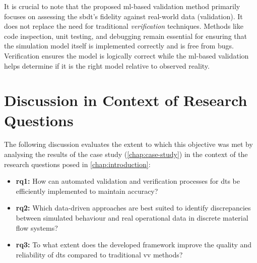 It is crucial to note that the proposed \gls{ml}-based validation method primarily focuses on assessing the \gls{sbdt}'s fidelity against real-world data (validation). It does not replace the need for traditional \textit{verification} techniques. Methods like code inspection, unit testing, and debugging remain essential for ensuring that the simulation model itself is implemented correctly and is free from bugs. Verification ensures the model is logically correct while the \gls{ml}-based validation helps determine if it is the right model relative to observed reality.

\section{Discussion in Context of Research Questions}
\label{sec:discussion_rqs}
The following discussion evaluates the extent to which this objective was met by analysing the results of the case study (\autoref{chap:case-study}) in the context of the research questions posed in \autoref{chap:introduction}:
\begin{itemize}
  \item \textbf{\gls{rq}1:} How can automated validation and verification processes for \gls{dt}s be efficiently implemented to maintain accuracy?
  \item \textbf{\gls{rq}2:} Which data-driven approaches are best suited to identify discrepancies between simulated behaviour and real operational data in discrete material flow systems?
  \item \textbf{\gls{rq}3:} To what extent does the developed framework improve the quality and reliability of \gls{dt}s compared to traditional \gls{vv} methods?
\end{itemize}

